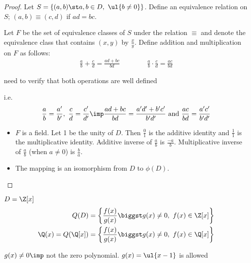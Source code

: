\documentclass[a4paper]{article}
\begin{document}
\begin{proof}
  Let \( S = \{(a,b) \st a,b\in D,\ \ul{b\neq 0}\} \). Define an equivalence relation on \( S \); \( (a,b) \equiv (c,d) \) if \( ad = bc \).

  Let \( F \) be the set of equivalence classes of \( S \) under the relation \( \equiv \) and denote the equivalence class that contains \( (x,y) \) by \( \frac{x}{y} \). Define addition and multiplication on \( F \) as follows:
  \begin{align*}
    \frac{a}{b} + \frac{c}{d} = \frac{ad+bc}{bd} \qquad\qquad \frac{a}{b} \cdot \frac{c}{d} = \frac{ac}{bd}
  \end{align*}
  \begin{exercise}
    need to verify that both operations are well defined
  \end{exercise}
  i.e. \begin{align*}
    \frac{a}{b}=\frac{a'}{b'},\ \frac{c}{d} = \frac{c'}{d'} \imp \frac{ad+bc}{bd} = \frac{a'd'+b'c'}{b'd'} \text{ and } \frac{ac}{bd}=\frac{a'c'}{b'd'}
  \end{align*}
  \begin{itemize}
    \item \( F \) is a field. Let 1 be the unity of \( D \). Then \( \frac{0}{1} \) is the additive identity and \( \frac{1}{1} \) is the multiplicative identity. Additive inverse of \( \frac{a}{b} \) is \( \frac{-a}{b} \). Multiplicative inverse of \( \frac{a}{b} \) (when \( a\neq 0 \)) is \( \frac{b}{a} \).
    \item The mapping  is an isomorphism from \( D \) to \( \phi(D) \).
  \end{itemize}
\end{proof}

\begin{example}
  \( D=\Z[x] \)
\begin{align*}
  Q(D) &= \left\{\frac{f(x)}{g(x)}\biggst g(x)\neq 0,\ f(x)\in\Z[x]\right\} \\
  \Q(x) = Q(\Q[x]) &= \left\{\frac{f(x)}{g(x)}\biggst g(x)\neq 0,\ f(x)\in\Q[x]\right\}
\end{align*}
\begin{note}
  \( g(x)\neq 0 \imp \) not the zero polynomial. \( g(x) = \ul{x-1} \) is allowed
\end{note}
\end{example}
\end{document}
